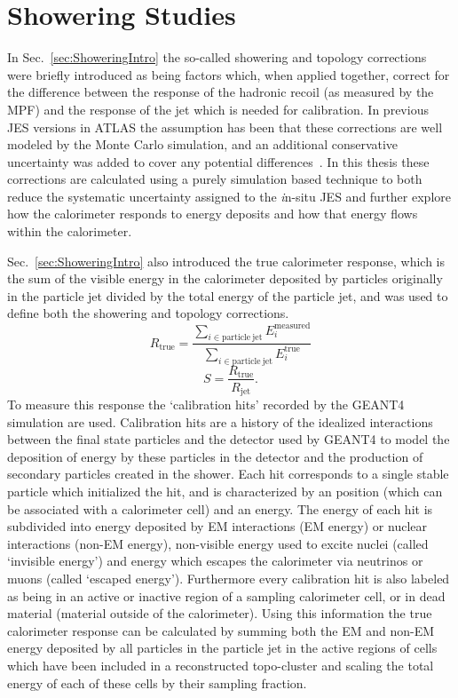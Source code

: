 \section{Showering Studies}
\label{Sec:Showering}

In Sec.~\ref{sec:ShoweringIntro} the so-called showering and topology corrections were briefly introduced as being factors which, when applied together, correct for the difference between the response of the hadronic recoil (as measured by the MPF) and the response of the jet which is needed for calibration.  
In previous JES versions in ATLAS the assumption has been that these corrections are well modeled by the Monte Carlo simulation, and an additional conservative uncertainty was added to cover any potential differences~\cite{ATLAS-CONF-2015-057}.  
In this thesis these corrections are calculated using a purely simulation based technique to both reduce the systematic uncertainty assigned to the {\textit in-situ} JES and further explore how the calorimeter responds to energy deposits and how that energy flows within the calorimeter.  

Sec.~\ref{sec:ShoweringIntro} also introduced the true calorimeter response, which is the sum of the visible energy in the calorimeter deposited by particles originally in the particle jet divided by the total energy of the particle jet, and was used to define both the showering and topology corrections.  
\begin{equation}
  R_{\mathrm{true}} = \frac{\sum_{i\in{\mathrm{particle~jet}}} E_i^{\mathrm{measured}}}{\sum_{i\in{\mathrm{particle~jet}}}E_i^{\mathrm{true}}}
\end{equation}
\begin{equation}
  S = \frac{R_{\mathrm{true}}}{R_{\mathrm{jet}}}.
\end{equation}
To measure this response the `calibration hits' recorded by the GEANT4 simulation are used.  
Calibration hits are a history of the idealized interactions between the final state particles and the detector used by GEANT4 to model the deposition of energy by these particles in the detector and the production of secondary particles created in the shower.  
Each hit corresponds to a single stable particle which initialized the hit, and is characterized by an position (which can be associated with a calorimeter cell) and an energy.  
The energy of each hit is subdivided into energy deposited by EM interactions (EM energy) or nuclear interactions (non-EM energy), non-visible energy used to excite nuclei (called `invisible energy') and energy which escapes the calorimeter via neutrinos or muons (called `escaped energy').  
Furthermore every calibration hit is also labeled as being in an active or inactive region of a sampling calorimeter cell, or in dead material (material outside of the calorimeter).  
Using this information the true calorimeter response can be calculated by summing both the EM and non-EM energy deposited by all particles in the particle jet in the active regions of cells which have been included in a reconstructed topo-cluster and scaling the total energy of each of these cells by their sampling fraction.   
 

